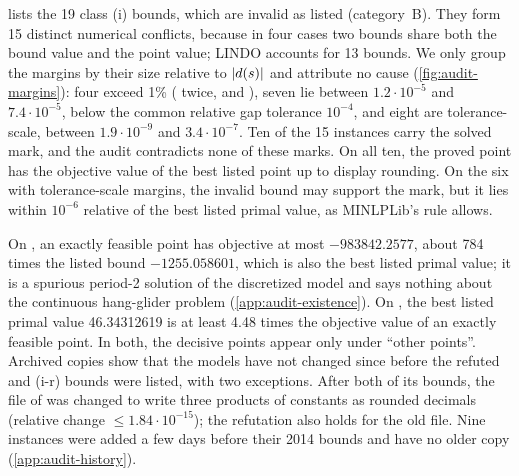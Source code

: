  lists the 19 class (i) bounds, which are invalid as listed (category~B).
They form 15 distinct numerical conflicts, because in four cases two bounds share both the bound value and the point value; LINDO accounts for 13 bounds.
We only group the margins by their size relative to $|d(s)|$ and attribute no cause (\cref{fig:audit-margins}): four exceed 1\% ( twice,  and ), seven lie between $1.2\cdot10^{-5}$ and $7.4\cdot10^{-5}$, below the common relative gap tolerance $10^{-4}$, and eight are tolerance-scale, between $1.9\cdot10^{-9}$ and $3.4\cdot10^{-7}$.
Ten of the 15 instances carry the solved mark, and the audit contradicts none of these marks.
On all ten, the proved point has the objective value of the best listed point up to display rounding.
On the six with tolerance-scale margins, the invalid bound may support the mark, but it lies within $10^{-6}$ relative of the best listed primal value, as MINLPLib's rule allows.

On , an exactly feasible point has objective at most $-983842.2577$, about 784 times the listed bound $-1255.058601$, which is also the best listed primal value; it is a spurious period-2 solution of the discretized model and says nothing about the continuous hang-glider problem (\cref{app:audit-existence}).
On , the best listed primal value 46.34312619 is at least 4.48 times the objective value of an exactly feasible point.
In both, the decisive points appear only under ``other points''.
Archived copies show that the models have not changed since before the refuted and (i-r) bounds were listed, with two exceptions.
After both of its bounds, the file of  was changed to write three products of constants as rounded decimals (relative change $\le1.84\cdot10^{-15}$); the refutation also holds for the old file.
Nine instances were added a few days before their 2014 bounds and have no older copy (\cref{app:audit-history}).

